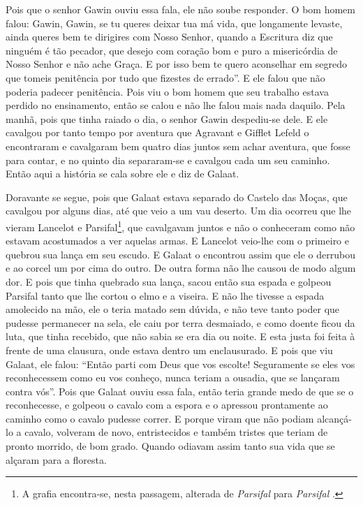 Pois que o senhor Gawin ouviu essa fala, ele não soube responder. O bom homem
falou: Gawin, Gawin, se tu queres deixar tua má vida, que longamente levaste,
ainda queres bem te dirigires com Nosso Senhor, quando a Escritura diz que
ninguém é tão pecador, que desejo com coração bom e puro a misericórdia de
Nosso Senhor e não ache Graça. E por isso bem te quero aconselhar em segredo
que tomeis penitência por tudo que fizestes de errado”. E ele falou que não
poderia padecer penitência. Pois viu o bom homem que seu trabalho estava
perdido no ensinamento, então se calou e não lhe falou mais nada daquilo. Pela
manhã, pois que tinha raiado o dia, o senhor Gawin despediu-se dele. E ele
cavalgou por tanto tempo por aventura que Agravant e Gifflet Lefeld o
encontraram e cavalgaram bem quatro dias juntos sem achar aventura, que fosse
para contar, e no quinto dia separaram-se e cavalgou cada um seu caminho. Então
aqui a história se cala sobre ele e diz de Galaat.

Doravante se segue, pois que Galaat estava separado do Castelo das Moças, que
cavalgou por alguns dias, até que veio a um vau deserto. Um dia ocorreu que lhe
vieram Lancelot e Parsifal\footnote{ A grafia encontra-se, nesta passagem,
alterada de \textit{Parsifal} para \textit{Parsifal }.},  que
cavalgavam juntos e não o conheceram como não estavam acostumados a ver aquelas
armas. E Lancelot veio-lhe com o primeiro e quebrou sua lança em seu escudo. E
Galaat o encontrou assim que ele o derrubou e ao corcel um por cima do outro.
De outra forma não lhe causou de modo algum dor. E pois que tinha quebrado sua
lança, sacou então sua espada e golpeou Parsifal tanto que lhe cortou o elmo e
a viseira. E não lhe tivesse a espada amolecido na mão, ele o teria matado sem
dúvida, e não teve tanto poder que pudesse permanecer na sela, ele caiu por
terra desmaiado, e como doente ficou da luta, que tinha recebido, que não sabia
se era dia ou noite. E esta justa foi feita à frente de uma clausura, onde
estava dentro um enclausurado. E pois que viu Galaat, ele falou: “Então parti
com Deus que vos escolte! Seguramente se eles vos reconhecessem como eu vos
conheço, nunca teriam a ousadia, que se lançaram contra vós”. Pois que Galaat
ouviu essa fala, então teria grande medo de que se o reconhecesse, e golpeou o
cavalo com a espora e o apressou prontamente ao caminho como o cavalo pudesse
correr. E porque viram que não podiam alcançá-lo a cavalo, volveram de novo,
entristecidos e também tristes que teriam de pronto morrido, de bom grado.
Quando odiavam assim tanto sua vida que se alçaram para a floresta.

